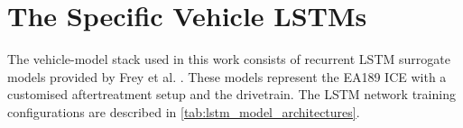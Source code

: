 

\section{The Specific Vehicle LSTMs}
\label{sec:impl_lstms}
The vehicle-model stack used in this work consists of recurrent \ac{LSTM} surrogate models provided by Frey et al. \cite{frey_data-based_2025}. These models represent the EA189 \ac{ICE} with a customised aftertreatment setup and the drivetrain. The \ac{LSTM} network training configurations are described in \autoref{tab:lstm_model_architectures}.

